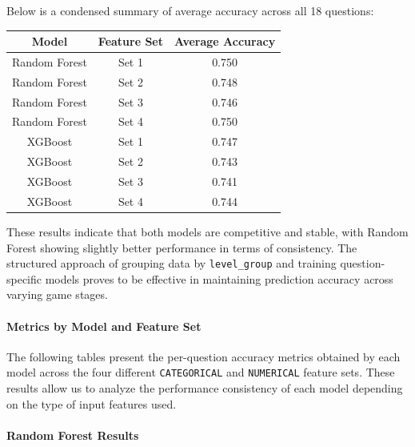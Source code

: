 \documentclass[12pt]{article}
\begin{document}
	\noindent Below is a condensed summary of average accuracy across all 18 questions:
	
	\begin{center}
		\begin{tabular}{|c|c|c|}
			\hline
			\textbf{Model} & \textbf{Feature Set} & \textbf{Average Accuracy} \\
			\hline
			Random Forest & Set 1 & 0.750 \\
			Random Forest & Set 2 & 0.748 \\
			Random Forest & Set 3 & 0.746 \\
			Random Forest & Set 4 & 0.750 \\
			\hline
			XGBoost       & Set 1 & 0.747 \\
			XGBoost       & Set 2 & 0.743 \\
			XGBoost       & Set 3 & 0.741 \\
			XGBoost       & Set 4 & 0.744 \\
			\hline
		\end{tabular}
	\end{center}
	
	\vspace{0.5em}
	These results indicate that both models are competitive and stable, with Random Forest showing slightly better performance in terms of consistency. The structured approach of grouping data by \texttt{level\_group} and training question-specific models proves to be effective in maintaining prediction accuracy across varying game stages.
	
	\paragraph{Metrics by Model and Feature Set}
	
	The following tables present the per-question accuracy metrics obtained by each model across the four different \texttt{CATEGORICAL} and \texttt{NUMERICAL} feature sets. These results allow us to analyze the performance consistency of each model depending on the type of input features used.
	
	\paragraph{Random Forest Results}\mbox{}\\
	
\end{document}
